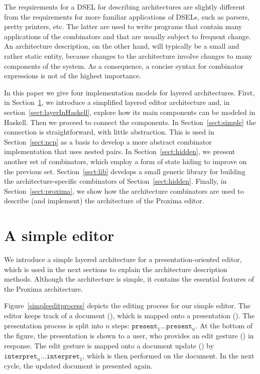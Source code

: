 \documentclass[preprint,natbib]{sigplanconf}
\begin{document}
\bc
The requirements for a DSEL for describing architectures are slightly different from the requirements for more familiar applications of DSELs, such as parsers, pretty printers, etc. The latter are used to write programs that contain many applications of the combinators and that are usually subject to frequent change. An architecture description, on the other hand, will typically be a small and rather static entity, because changes to the architecture involve changes to many components of the system.  As a consequence, a concise syntax for combinator expressions is not of the highest importance.
\ec


In this paper we give four implementation models for layered architectures. First, in Section~\ref{sect:simpleEditor}, we introduce a simplified layered editor architecture and, in section~\ref{sect:layerInHaskell}, explore how its main components can be modeled in Haskell. Then we proceed to connect the components. In Section~\ref{sect:simple} the connection is straightforward, with little abstraction. This is used in Section~\ref{sect:ncp} as a basis to develop a more abstract combinator implementation that uses nested pairs. In Section~\ref{sect:hidden}, we present another set of combinators, which employ a form of state hiding to improve on the previous set. Section~\ref{sect:lib} develops a small generic library for building the architecture-specific combinators of Section~\ref{sect:hidden}. 
\bc
Finally, in Section~\ref{sect:proxima}, we show how the architecture combinators are used to describe (and implement) the architecture of  the Proxima editor.%
\ec


%																
%																
%																
\section{A simple editor}\label{sect:simpleEditor}


We introduce a simple layered architecture for a presentation-oriented editor, which is used in the next sections to explain the architecture description methods. Although the architecture is simple, it contains the essential features of the Proxima architecture. 


Figure~\ref{simpleeditprocess} depicts the editing process for our simple editor. The editor keeps track of a document (), which is mapped onto a presentation (). The presentation process is split into $n$ steps: $\mathtt{present}_1 \dots \mathtt{present}_{n}$. At the bottom of the figure, the presentation is shown to a user, who provides an edit gesture () in response. The edit gesture is mapped onto a document update () by $\mathtt{interpret}_{n} \dots \mathtt{interpret}_1$, which is then performed on the document. In the next cycle, the updated document is presented again.
\end{document}
